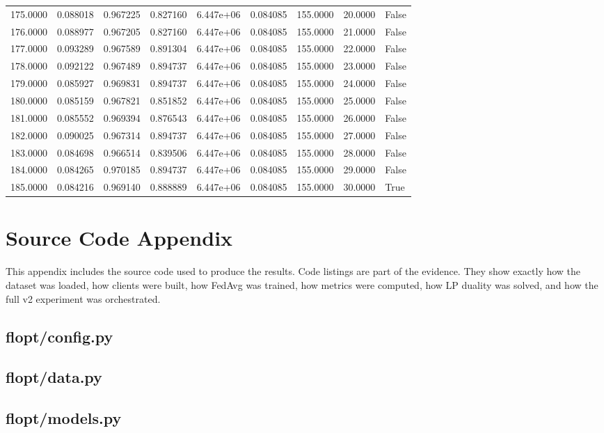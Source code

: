 \documentclass[11pt]{report}
\begin{document}
\begin{longtable}{lllllllll}
175.0000 & 0.088018 & 0.967225 & 0.827160 & 6.447e+06 & 0.084085 & 155.0000 & 20.0000 & False \\
176.0000 & 0.088977 & 0.967205 & 0.827160 & 6.447e+06 & 0.084085 & 155.0000 & 21.0000 & False \\
177.0000 & 0.093289 & 0.967589 & 0.891304 & 6.447e+06 & 0.084085 & 155.0000 & 22.0000 & False \\
178.0000 & 0.092122 & 0.967489 & 0.894737 & 6.447e+06 & 0.084085 & 155.0000 & 23.0000 & False \\
179.0000 & 0.085927 & 0.969831 & 0.894737 & 6.447e+06 & 0.084085 & 155.0000 & 24.0000 & False \\
180.0000 & 0.085159 & 0.967821 & 0.851852 & 6.447e+06 & 0.084085 & 155.0000 & 25.0000 & False \\
181.0000 & 0.085552 & 0.969394 & 0.876543 & 6.447e+06 & 0.084085 & 155.0000 & 26.0000 & False \\
182.0000 & 0.090025 & 0.967314 & 0.894737 & 6.447e+06 & 0.084085 & 155.0000 & 27.0000 & False \\
183.0000 & 0.084698 & 0.966514 & 0.839506 & 6.447e+06 & 0.084085 & 155.0000 & 28.0000 & False \\
184.0000 & 0.084265 & 0.970185 & 0.894737 & 6.447e+06 & 0.084085 & 155.0000 & 29.0000 & False \\
185.0000 & 0.084216 & 0.969140 & 0.888889 & 6.447e+06 & 0.084085 & 155.0000 & 30.0000 & True \\
\bottomrule
\end{longtable}
\appendix
\chapter{Source Code Appendix}
This appendix includes the source code used to produce the results. Code listings are part of the
evidence. They show exactly how the dataset was loaded, how clients were built, how FedAvg was
trained, how metrics were computed, how LP duality was solved, and how the full v2 experiment was
orchestrated.

\section{flopt/config.py}

\section{flopt/data.py}

\section{flopt/models.py}

\end{document}
